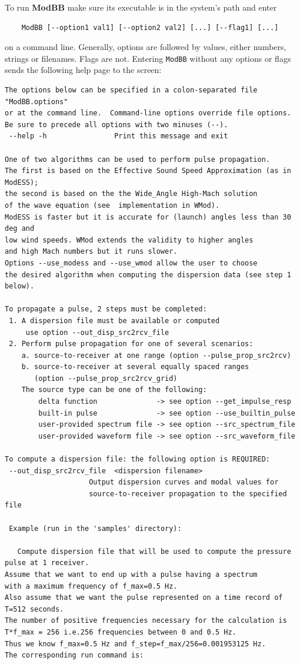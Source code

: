 To run {\bf ModBB} make sure its executable is in the system's path and enter 
\begin{verbatim} 
    ModBB [--option1 val1] [--option2 val2] [...] [--flag1] [...] 
\end{verbatim}
on a command line. Generally, options are followed by values, either numbers, strings or filenames. Flags are not. Entering \verb"ModBB" without any options or flags sends the following help page to the screen: 
\begin{verbatim}
The options below can be specified in a colon-separated file "ModBB.options"
or at the command line.  Command-line options override file options.
Be sure to precede all options with two minuses (--).
 --help -h                Print this message and exit

One of two algorithms can be used to perform pulse propagation.
The first is based on the Effective Sound Speed Approximation (as in ModESS);
the second is based on the the Wide_Angle High-Mach solution 
of the wave equation (see  implementation in WMod).
ModESS is faster but it is accurate for (launch) angles less than 30 deg and
low wind speeds. WMod extends the validity to higher angles
and high Mach numbers but it runs slower.
Options --use_modess and --use_wmod allow the user to choose
the desired algorithm when computing the dispersion data (see step 1 below).

To propagate a pulse, 2 steps must be completed:
 1. A dispersion file must be available or computed
     use option --out_disp_src2rcv_file
 2. Perform pulse propagation for one of several scenarios:
    a. source-to-receiver at one range (option --pulse_prop_src2rcv)
    b. source-to-receiver at several equally spaced ranges 
       (option --pulse_prop_src2rcv_grid)
    The source type can be one of the following:
        delta function              -> see option --get_impulse_resp
        built-in pulse              -> see option --use_builtin_pulse
        user-provided spectrum file -> see option --src_spectrum_file
        user-provided waveform file -> see option --src_waveform_file

To compute a dispersion file: the following option is REQUIRED:
 --out_disp_src2rcv_file  <dispersion filename>
                    Output dispersion curves and modal values for
                    source-to-receiver propagation to the specified file

 Example (run in the 'samples' directory):

   Compute dispersion file that will be used to compute the pressure pulse at 1 receiver. 
Assume that we want to end up with a pulse having a spectrum
with a maximum frequency of f_max=0.5 Hz. 
Also assume that we want the pulse represented on a time record of T=512 seconds. 
The number of positive frequencies necessary for the calculation is 
T*f_max = 256 i.e.256 frequencies between 0 and 0.5 Hz. 
Thus we know f_max=0.5 Hz and f_step=f_max/256=0.001953125 Hz. 
The corresponding run command is:


\end{verbatim}
